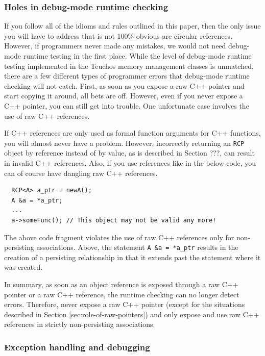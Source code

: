 \documentclass[pdf,ps2pdf,11pt]{SANDreport}
\begin{document}
%
{}\subsubsection{Holes in debug-mode runtime checking}
%

If you follow all of the idioms and rules outlined in this paper, then
the only issue you will have to address that is not 100\% obvious are
circular references.  However, if programmers never made any mistakes,
we would not need debug-mode runtime testing in the first place.
While the level of debug-mode runtime testing implemented in the
Teuchos memory management classes is unmatched, there are a few
different types of programmer errors that debug-mode runtime checking
will not catch.  First, as soon as you expose a raw C++ pointer and
start copying it around, all bets are off.  However, even if you never
expose a C++ pointer, you can still get into trouble.  One unfortunate
case involves the use of raw C++ references.

If C++ references are only used as formal function arguments for C++
functions, you will almost never have a problem.  However, incorrectly
returning an {}\texttt{RCP} object by reference instead of by value,
as is described in Section ???, can result in invalid C++ references.
Also, if you use references like in the below code, you can of course
have dangling raw C++ references.

{\small\begin{verbatim}
  RCP<A> a_ptr = newA();
  A &a = *a_ptr;
  ...
  a->someFunc(); // This object may not be valid any more!
\end{verbatim}}

The above code fragment violates the use of raw C++ references only
for non-persisting associations.  Above, the statement {}\texttt{A \&a
= *a\_ptr} results in the creation of a persisting relationship in that
it extends past the statement where it was created.

In summary, as soon as an object reference is exposed through a raw
C++ pointer or a raw C++ reference, the runtime checking can no longer
detect errors.  Therefore, never expose a raw C++ pointer (except for
the situations described in Section {}\ref{sec:role-of-raw-pointers})
and only expose and use raw C++ references in strictly non-persisting
associations.


%
{}\subsubsection{Exception handling and debugging}
%
\end{document}

